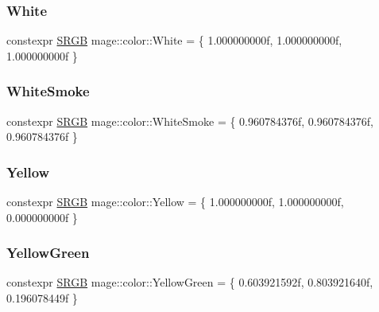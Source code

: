 \hypertarget{namespacemage_1_1color_aecd3f854835fd8ac76f38a369ea539ed}{}\label{namespacemage_1_1color_aecd3f854835fd8ac76f38a369ea539ed} 
\subsubsection{\texorpdfstring{White}{White}}
{\footnotesize\ttfamily constexpr \hyperlink{structmage_1_1_s_r_g_b}{S\+R\+GB} mage\+::color\+::\+White = \{ 1.\+000000000f, 1.\+000000000f, 1.\+000000000f \}}

\hypertarget{namespacemage_1_1color_ae04903c7f3c3579b0c66775e29dd41fe}{}\label{namespacemage_1_1color_ae04903c7f3c3579b0c66775e29dd41fe} 
\subsubsection{\texorpdfstring{White\+Smoke}{WhiteSmoke}}
{\footnotesize\ttfamily constexpr \hyperlink{structmage_1_1_s_r_g_b}{S\+R\+GB} mage\+::color\+::\+White\+Smoke = \{ 0.\+960784376f, 0.\+960784376f, 0.\+960784376f \}}

\hypertarget{namespacemage_1_1color_af44fd30e339165ca6ac5ce01cef3050f}{}\label{namespacemage_1_1color_af44fd30e339165ca6ac5ce01cef3050f} 
\subsubsection{\texorpdfstring{Yellow}{Yellow}}
{\footnotesize\ttfamily constexpr \hyperlink{structmage_1_1_s_r_g_b}{S\+R\+GB} mage\+::color\+::\+Yellow = \{ 1.\+000000000f, 1.\+000000000f, 0.\+000000000f \}}

\hypertarget{namespacemage_1_1color_a5267fc3edf483b5524ce1b5faccf81aa}{}\label{namespacemage_1_1color_a5267fc3edf483b5524ce1b5faccf81aa} 
\subsubsection{\texorpdfstring{Yellow\+Green}{YellowGreen}}
{\footnotesize\ttfamily constexpr \hyperlink{structmage_1_1_s_r_g_b}{S\+R\+GB} mage\+::color\+::\+Yellow\+Green = \{ 0.\+603921592f, 0.\+803921640f, 0.\+196078449f \}}

